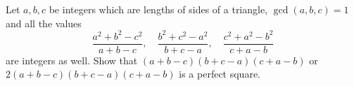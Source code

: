 Let $a,b,c$ be integers which are lengths of sides of a triangle, $\gcd(a,b,c)=1$ and all the values $$\frac{a^2+b^2-c^2}{a+b-c},\quad\frac{b^2+c^2-a^2}{b+c-a},\quad\frac{c^2+a^2-b^2}{c+a-b}$$are integers as well. Show that $(a+b-c)(b+c-a)(c+a-b)$ or $2(a+b-c)(b+c-a)(c+a-b)$ is a perfect square.